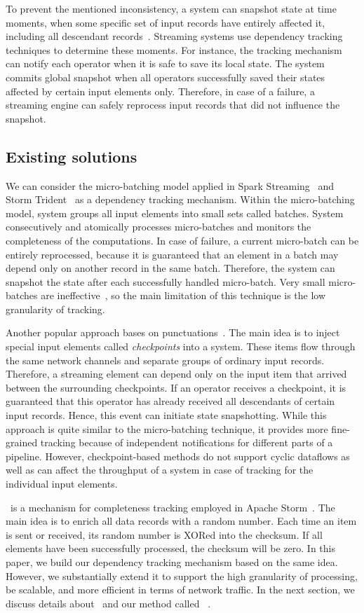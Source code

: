 To prevent the mentioned inconsistency, a system can snapshot state at time moments, when some specific set of input records have entirely affected it, including all descendant records~\cite{2015arXiv150608603C, thepaper}. Streaming systems use dependency tracking techniques to determine these moments. For instance, the tracking mechanism can notify each operator when it is safe to save its local state. The system commits global snapshot when all operators successfully saved their states affected by certain input elements only. Therefore, in case of a failure, a streaming engine can safely reprocess input records that did not influence the snapshot.

\subsection{Existing solutions}
We can consider the micro-batching model applied in Spark Streaming~\cite{Zaharia:2012:DSE:2342763.2342773} and Storm Trident~\cite{apache:storm:trident} as a dependency tracking mechanism. Within the micro-batching model, system groups all input elements into small sets called batches. System consecutively and atomically processes micro-batches and monitors the completeness of the computations. In case of failure, a current micro-batch can be entirely reprocessed, because it is guaranteed that an element in a batch may depend only on another record in the same batch. Therefore, the system can snapshot the state after each successfully handled micro-batch. Very small micro-batches are ineffective~\cite{Zaharia:2012:DSE:2342763.2342773}, so the main limitation of this technique is the low granularity of tracking.

Another popular approach bases on punctuations~\cite{Tucker:2003:EPS:776752.776780}. The main idea is to inject special input elements called {\em checkpoints} into a system. These items flow through the same network channels and separate groups of ordinary input records. Therefore, a streaming element can depend only on the input item that arrived between the surrounding checkpoints. If an operator receives a checkpoint, it is guaranteed that this operator has already received all descendants of certain input records. Hence, this event can initiate state snapshotting. While this approach is quite similar to the micro-batching technique, it provides more fine-grained tracking because of independent notifications for different parts of a pipeline. However, checkpoint-based methods do not support cyclic dataflows as well as can affect the throughput of a system in case of tracking for the individual input elements.

\acker\ is a mechanism for completeness tracking employed in Apache Storm~\cite{apache:storm}. The main idea is to enrich all data records with a random number. Each time an item is sent or received, its random number is XORed into the checksum. If all elements have been successfully processed, the checksum will be zero. In this paper, we build our dependency tracking mechanism based on the same idea. However, we substantially extend it to support the high granularity of processing, be scalable, and more efficient in terms of network traffic. In the next section, we discuss details about \acker\ and our method called \tracker\ .